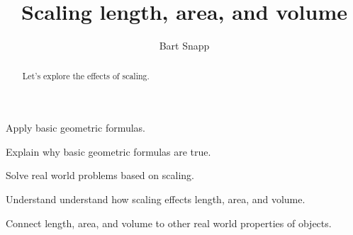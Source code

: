 \documentclass[handout,nooutcomes,noauthor]{ximera}
\title{Scaling length, area, and volume}
\author{Bart Snapp}
\begin{document}
\begin{abstract}
  Let's explore the effects of scaling.
\end{abstract}
\maketitle


\begin{listSectionOutcomes}
\item Apply basic geometric formulas. 
\item Explain why basic geometric formulas are true.
\item Solve real world problems based on scaling.
\item Understand understand how scaling effects length, area, and
  volume.
\item Connect length, area, and volume to other real world properties
  of objects.
\end{listSectionOutcomes}
\end{document}
